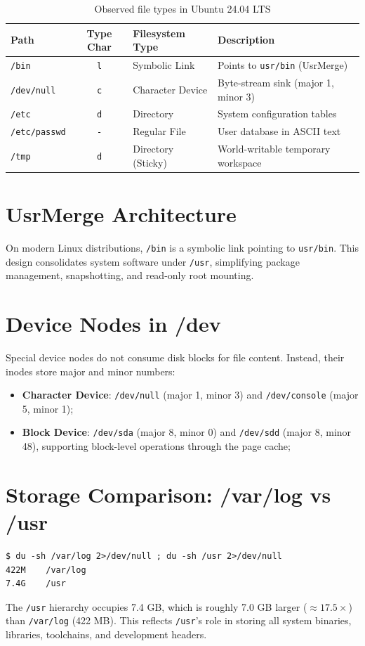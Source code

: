 \documentclass{assets/utmreport}
\begin{document}
\begin{table}[H]
\centering
\caption{Observed file types in Ubuntu 24.04 LTS}
\begin{tabular}{lcll}
\toprule
\textbf{Path} & \textbf{Type Char} & \textbf{Filesystem Type} & \textbf{Description} \\
\midrule
\texttt{/bin} & \texttt{l} & Symbolic Link & Points to \texttt{usr/bin} (UsrMerge) \\
\texttt{/dev/null} & \texttt{c} & Character Device & Byte-stream sink (major 1, minor 3) \\
\texttt{/etc} & \texttt{d} & Directory & System configuration tables \\
\texttt{/etc/passwd} & \texttt{-} & Regular File & User database in ASCII text \\
\texttt{/tmp} & \texttt{d} & Directory (Sticky) & World-writable temporary workspace \\
\bottomrule
\end{tabular}
\end{table}

\section{UsrMerge Architecture}
On modern Linux distributions, \texttt{/bin} is a symbolic link pointing to \texttt{usr/bin}. This design consolidates system software under \texttt{/usr}, simplifying package management, snapshotting, and read-only root mounting.

\section{Device Nodes in /dev}
Special device nodes do not consume disk blocks for file content. Instead, their inodes store major and minor numbers:
\begin{itemize}
\item \textbf{Character Device}: \texttt{/dev/null} (major 1, minor 3) and \texttt{/dev/console} (major 5, minor 1);
\item \textbf{Block Device}: \texttt{/dev/sda} (major 8, minor 0) and \texttt{/dev/sdd} (major 8, minor 48), supporting block-level operations through the page cache;
\end{itemize}

\section{Storage Comparison: /var/log vs /usr}
\begin{verbatim}
$ du -sh /var/log 2>/dev/null ; du -sh /usr 2>/dev/null
422M    /var/log
7.4G    /usr
\end{verbatim}
The \texttt{/usr} hierarchy occupies 7.4 GB, which is roughly 7.0 GB larger ($\approx 17.5 \times$) than \texttt{/var/log} (422 MB). This reflects \texttt{/usr}'s role in storing all system binaries, libraries, toolchains, and development headers.
\end{document}
